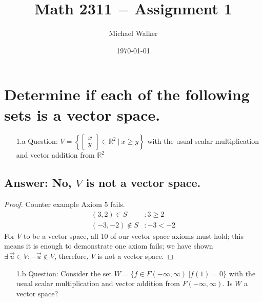 \documentclass[11pt]{article}
\author{Michael Walker}
\title{Math 2311 $-$ Assignment 1}
\date{\today}
\newcommand{\DS} [1] {${\displaystyle #1}$}
\begin{document}
\maketitle
\tableofcontents
\pagebreak
\section{Determine if each of the following sets is a vector space.}
\begin{enumerate}
        \item[1.a]Question: $V=$\DS{ \left\{ \left[ \begin{array}{c}
                                      x \\
                                      y
                              \end{array} \right] \in\mathbb{R}^2 \ | \ x \geq{y} \right\}}
              with the usual scalar multiplication
              and vector addition from $\mathbb{R}^2$
\end{enumerate}
\subsection{Answer: No, $V$ is not a vector space.}

\begin{proof}
        Counter example Axiom 5 fails.
        \begin{align*}
                (3, 2) \in S      & : 3\geq 2 \\
                (-3, -2) \notin S & : -3 < -2
        \end{align*}
        For $V$ to be a vector space, all 10 of our vector space axioms must hold; this means it is enough to demonstrate one axiom fails; we have shown $\exists\ \vec{u} \in V: -\vec{u} \notin V$, therefore, $V$ is not a vector space.
\end{proof}
\begin{enumerate}
        \item[1.b]Question: Consider the set $W = \{f \in F(-\infty, \infty) \ | f(1) = 0\}$
              with the usual scalar multiplication and vector addition from
              $F(-\infty, \infty)$.
              Is $W$ a vector space?
\end{enumerate}
\end{document}

